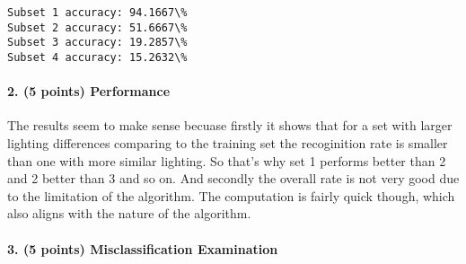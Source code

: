 \documentclass[11pt]{article}
\begin{document}
    \begin{Verbatim}[commandchars=\\\{\}]
Subset 1 accuracy: 94.1667\%
Subset 2 accuracy: 51.6667\%
Subset 3 accuracy: 19.2857\%
Subset 4 accuracy: 15.2632\%

    \end{Verbatim}

    \paragraph{2. (5 points) Performance}\label{points-performance}

The results seem to make sense becuase firstly it shows that for a set
with larger lighting differences comparing to the training set the
recoginition rate is smaller than one with more similar lighting. So
that's why set 1 performs better than 2 and 2 better than 3 and so on.
And secondly the overall rate is not very good due to the limitation of
the algorithm. The computation is fairly quick though, which also aligns
with the nature of the algorithm.

\paragraph{3. (5 points) Misclassification
Examination}\label{points-misclassification-examination}
\end{document}
